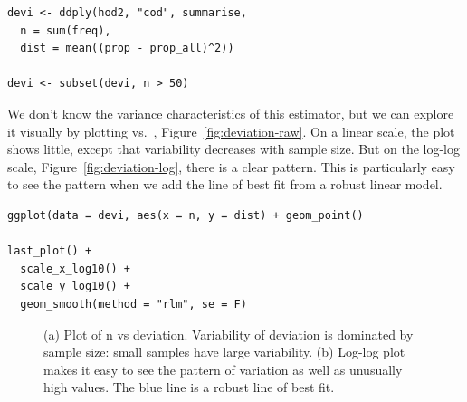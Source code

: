 \documentclass[article]{jss}
\begin{document}
\begin{Verbatim}
devi <- ddply(hod2, "cod", summarise, 
  n = sum(freq), 
  dist = mean((prop - prop_all)^2))

devi <- subset(devi, n > 50)
\end{Verbatim}

We don't know the variance characteristics of this estimator, but we can explore it visually by plotting  vs.\ , Figure~\ref{fig:deviation-raw}. On a linear scale, the plot shows little, except that variability decreases with sample size. But on the log-log scale, Figure~\ref{fig:deviation-log}, there is a clear pattern. This is particularly easy to see the pattern when we add the line of best fit from a robust linear model. 

\begin{Verbatim}
ggplot(data = devi, aes(x = n, y = dist) + geom_point()

last_plot() + 
  scale_x_log10() + 
  scale_y_log10() +
  geom_smooth(method = "rlm", se = F)
\end{Verbatim}

\begin{figure}[htbp]
  \centering

  \caption{(a) Plot of n vs deviation. Variability of deviation is dominated by sample size: small samples have large variability. (b) Log-log plot makes it easy to see the pattern of variation as well as unusually high values.  The blue line is a robust line of best fit.}
  \label{fig:deviation}
\end{figure}
\end{document}
